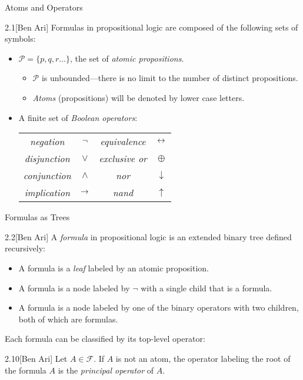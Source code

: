 \begin{wideslide}[bm=,toc=]{Atoms and Operators}
\begin{defn}{2.1}[Ben Ari]
Formulas in propositional logic are composed of the following sets of symbols:
\begin{itemize}
\item $\mathcal{P} = \{p,q,r...\}$, the set of \emph{atomic propositions}.
\begin{itemize}
\item $\mathcal{P}$ is unbounded---there is no limit to the number of distinct
propositions.
\item \emph{Atoms} (propositions) will be denoted by lower case letters.
\end{itemize}
\item A finite set of \emph{Boolean operators}:
\begin{center}
\begin{tabular}{|c c||c c|}
\hline
\emph{negation}     & $\mathop{\neg}$  & \emph{equivalence}  & $\mathbin{\leftrightarrow}$  \\
\emph{disjunction}  & $\lor$  & \emph{exclusive or} & $\oplus$  \\
\emph{conjunction}  & $\land$ & \emph{nor}          & $\downarrow$  \\
\emph{implication}  & $\mathbin{\rightarrow}$   & \emph{nand}         & $\uparrow$  \\
\hline
\end{tabular}
\end{center}

\end{itemize}
\end{defn}
\end{wideslide}

\begin{wideslide}[bm=,toc=]{Formulas as Trees}
\begin{defn}{2.2}[Ben Ari]
A \emph{formula} in propositional logic is an extended binary tree defined recursively:
\begin{itemize}
\item A formula is a \emph{leaf} labeled by an atomic proposition.
\item A formula is a node labeled by $\neg$ with a single child that is a
formula.
\item A formula is a node labeled by one of the binary operators with two
children, both of which are formulas. 
\end{itemize}
\end{defn}
Each formula can be classified by its top-level operator:
\begin{defn}{2.10}[Ben Ari]
Let $A \in \mathcal{F}$. If $A$ is not an atom, the operator labeling
the root of the formula $A$ is the \emph{principal operator} of $A$.
\end{defn}

\end{wideslide}

